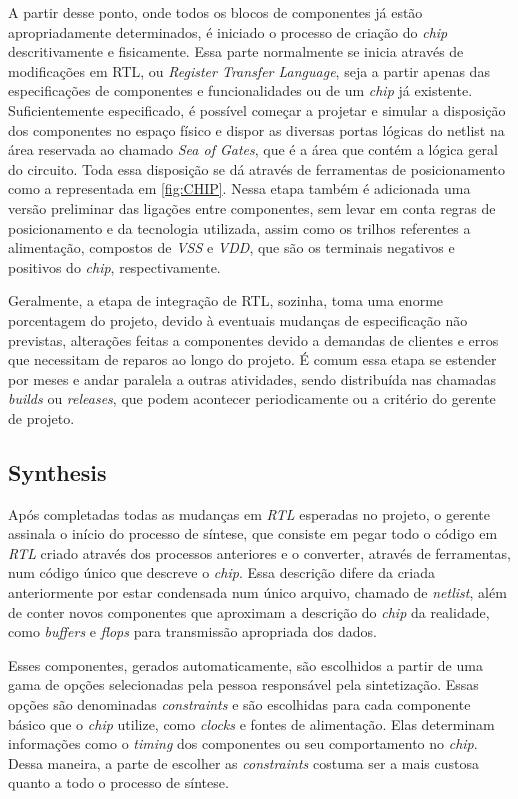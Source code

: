 \documentclass[
	12pt,				%
    oneside,			%
	a4paper,			%
	english,			%
	french,				%
	spanish,			%
	brazil				%
	]{abntex2}
\begin{document}
A partir desse ponto, onde todos os blocos de componentes já estão apropriadamente determinados, é iniciado o processo de criação do \textit{chip} descritivamente e fisicamente. Essa parte normalmente se inicia através de modificações em RTL, ou \textit{Register Transfer Language}, seja a partir apenas das especificações de componentes e funcionalidades ou de um \textit{chip} já existente. Suficientemente especificado, é possível começar a projetar e simular a disposição dos componentes no espaço físico e dispor as diversas portas lógicas do netlist na área reservada ao chamado \textit{Sea of Gates}, que é a área que contém a lógica geral do circuito. Toda essa disposição se dá através de ferramentas de posicionamento como a representada em \ref{fig:CHIP}. Nessa etapa também é adicionada uma versão preliminar das ligações entre componentes, sem levar em conta regras de posicionamento e da tecnologia utilizada, assim como os trilhos referentes a alimentação, compostos de \textit{VSS} e \textit{VDD}, que são os terminais negativos e positivos do \textit{chip}, respectivamente.



Geralmente, a etapa de integração de RTL, sozinha, toma uma enorme porcentagem do projeto, devido à eventuais mudanças de especificação não previstas, alterações feitas a componentes devido a demandas de clientes e erros que necessitam de reparos ao longo do projeto. É comum essa etapa se estender por meses e andar paralela a outras atividades, sendo distribuída nas chamadas \textit{builds} ou \textit{releases}, que podem acontecer periodicamente ou a critério do gerente de projeto.

\subsection{Synthesis}

Após completadas todas as mudanças em \textit{RTL} esperadas no projeto, o gerente assinala o início do processo de síntese, que consiste em pegar todo o código em \textit{RTL} criado através dos processos anteriores e o converter, através de ferramentas, num código único que descreve o \textit{chip}. Essa descrição difere da criada anteriormente por estar condensada num único arquivo, chamado de \textit{netlist}, além de conter novos componentes que aproximam a descrição do \textit{chip} da realidade, como \textit{buffers} e \textit{flops} para transmissão apropriada dos dados.

Esses componentes, gerados automaticamente, são escolhidos a partir de uma gama de opções selecionadas pela pessoa responsável pela sintetização. Essas opções são denominadas \textit{constraints} e são escolhidas para cada componente básico que o \textit{chip} utilize, como \textit{clocks} e fontes de alimentação. Elas determinam informações como o \textit{timing} dos componentes ou seu comportamento no \textit{chip}. Dessa maneira, a parte de escolher as \textit{constraints} costuma ser a mais custosa quanto a todo o processo de síntese.
\end{document}

